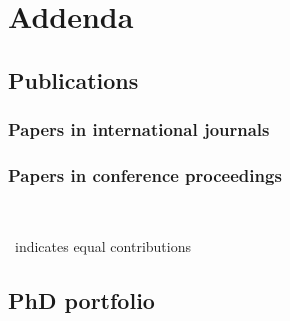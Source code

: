 \chapter*{Addenda}

\clearpage
\thispagestyle{nohead}
\section*{Publications}

\subsection*{Papers in international journals}

\subsection*{Papers in conference proceedings}
\thispagestyle{nohead}


~

\noindent\dag~indicates equal contributions

\clearpage
\thispagestyle{nohead}
\section*{PhD portfolio}

